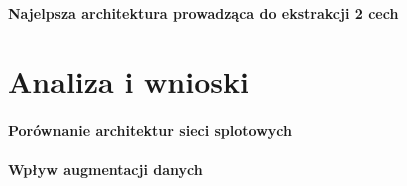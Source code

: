 \documentclass[10pt]{article}
\begin{document}
\paragraph{Najelpsza architektura prowadząca do ekstrakcji 2 cech}

\pagebreak
\section{Analiza i wnioski}\label{sec:wyniki}

\paragraph{Porównanie architektur sieci splotowych}

\paragraph{Wpływ augmentacji danych}
\end{document}
